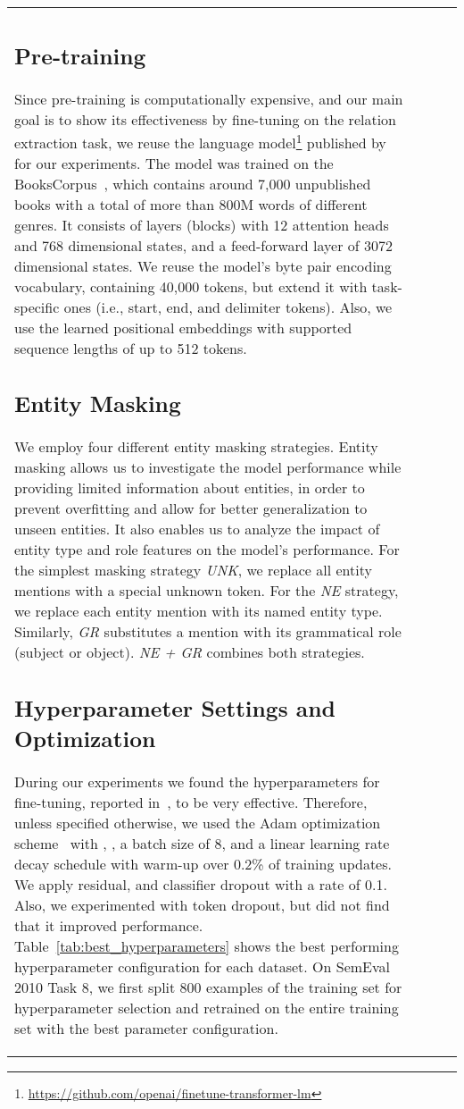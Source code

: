 \documentclass[akbc,twoside,11pt]{article}
\begin{document}
\begin{table}[ht!]
\begin{tabular}{p{6cm} l l l}
\subsection{Pre-training}
\label{subsec:exp_pretraining}
Since pre-training is computationally expensive, and our main goal is to show its effectiveness by fine-tuning on the relation extraction task, we reuse the language model\footnote{\url{https://github.com/openai/finetune-transformer-lm}} published by~\citet{radford_improvinglu_2018} for our experiments. The model was trained on the BooksCorpus~\cite{zhu_aligningba_2015}, which contains around 7,000 unpublished books with a total of more than 800M words of different genres. It consists of  layers (blocks) with 12 attention heads and 768 dimensional states, and a feed-forward layer of 3072 dimensional states. We reuse the model's byte pair encoding vocabulary, containing 40,000 tokens, but extend it with task-specific ones (i.e., start, end, and delimiter tokens). Also, we use the learned positional embeddings with supported sequence lengths of up to 512 tokens.

\subsection{Entity Masking}
\label{subsec:exp_masking}
We employ four different entity masking strategies. Entity masking allows us to investigate the model performance while providing limited information about entities, in order to prevent overfitting and allow for better generalization to unseen entities. It also enables us to analyze the impact of entity type and role features on the model's performance. For the simplest masking strategy \textit{UNK}, we replace all entity mentions with a special unknown token. For the \textit{NE} strategy, we replace each entity mention with its named entity type. Similarly, \textit{GR} substitutes a mention with its grammatical role (subject or object). \textit{NE + GR} combines both strategies.

\subsection{Hyperparameter Settings and Optimization}
\label{subsec:exp_hyperparams}
During our experiments we found the hyperparameters for fine-tuning, reported in~\cite{radford_improvinglu_2018}, to be very effective. Therefore, unless specified otherwise, we used the Adam optimization scheme~\cite{adam_2015} with , , a batch size of 8, and a linear learning rate decay schedule with warm-up over 0.2\% of training updates. We apply residual, and classifier dropout with a rate of 0.1. Also, we experimented with token dropout, but did not find that it improved performance. Table~\ref{tab:best_hyperparameters} shows the best performing hyperparameter configuration for each dataset. On SemEval 2010 Task 8, we first split 800 examples of the training set for hyperparameter selection and retrained on the entire training set with the best parameter configuration.


\end{tabular}
\end{table}
\end{document}
